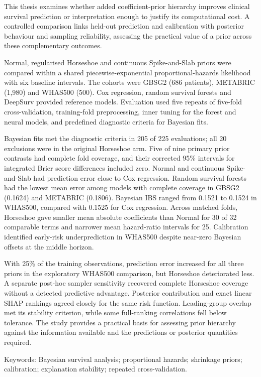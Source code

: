 This thesis examines whether added coefficient-prior hierarchy improves clinical survival prediction or interpretation enough to justify its computational cost. A controlled comparison links held-out prediction and calibration with posterior behaviour and sampling reliability, assessing the practical value of a prior across these complementary outcomes.

Normal, regularised Horseshoe and continuous Spike-and-Slab priors were compared within a shared piecewise-exponential proportional-hazards likelihood with six baseline intervals. The cohorts were GBSG2 (686 patients), METABRIC (1,980) and WHAS500 (500). Cox regression, random survival forests and DeepSurv provided reference models. Evaluation used five repeats of five-fold cross-validation, training-fold preprocessing, inner tuning for the forest and neural models, and predefined diagnostic criteria for Bayesian fits.

Bayesian fits met the diagnostic criteria in 205 of 225 evaluations; all 20 exclusions were in the original Horseshoe arm. Five of nine primary prior contrasts had complete fold coverage, and their corrected 95\% intervals for integrated Brier score differences included zero. Normal and continuous Spike-and-Slab had prediction error close to Cox regression. Random survival forests had the lowest mean error among models with complete coverage in GBSG2 (0.1624) and METABRIC (0.1806). Bayesian IBS ranged from 0.1521 to 0.1524 in WHAS500, compared with 0.1525 for Cox regression. Across matched folds, Horseshoe gave smaller mean absolute coefficients than Normal for 30 of 32 comparable terms and narrower mean hazard-ratio intervals for 25. Calibration identified early-risk underprediction in WHAS500 despite near-zero Bayesian offsets at the middle horizon.

With 25\% of the training observations, prediction error increased for all three priors in the exploratory WHAS500 comparison, but Horseshoe deteriorated less. A separate post-hoc sampler sensitivity recovered complete Horseshoe coverage without a detected predictive advantage. Posterior contribution and exact linear SHAP rankings agreed closely for the same risk function. Leading-group overlap met its stability criterion, while some full-ranking correlations fell below tolerance. The study provides a practical basis for assessing prior hierarchy against the information available and the predictions or posterior quantities required.

Keywords: Bayesian survival analysis; proportional hazards; shrinkage priors; calibration; explanation stability; repeated cross-validation.
